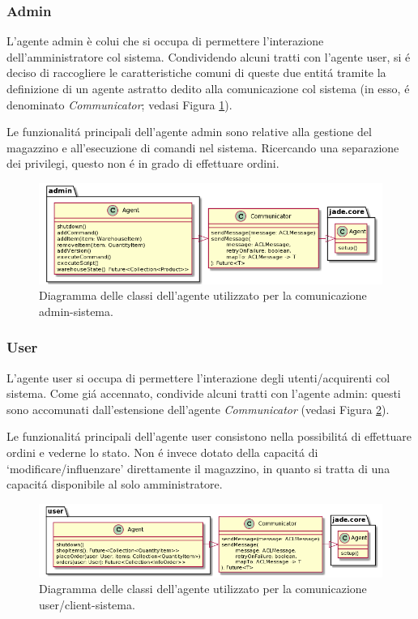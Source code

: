 \subsubsection{Admin}
L'agente admin \`e colui che si occupa di permettere l'interazione dell'amministratore col sistema. Condividendo alcuni tratti con l'agente user, si \'e deciso di raccogliere le caratteristiche comuni di queste due entit\'a tramite la definizione di un agente astratto dedito alla comunicazione col sistema (in esso, \'e denominato \textit{Communicator}; vedasi Figura \ref{fig:class_diagram_admin_agent}).

Le funzionalit\'a principali dell'agente admin sono relative alla gestione del magazzino e all'esecuzione di comandi nel sistema. Ricercando una separazione dei privilegi, questo non \'e in grado di effettuare ordini.
\begin{figure}[!ht]\centering
    \includegraphics[width=\textwidth]{section/design/figure/admin/class_diagram.png}
    \caption{Diagramma delle classi dell'agente utilizzato per la comunicazione admin-sistema.}
    \label{fig:class_diagram_admin_agent}
\end{figure}

\subsubsection{User}
L'agente user si occupa di permettere l'interazione degli utenti/acquirenti col sistema. Come gi\'a accennato, condivide alcuni tratti con l'agente admin: questi sono accomunati dall'estensione dell'agente \textit{Communicator} (vedasi Figura \ref{fig:class_diagram_user_agent}).

Le funzionalit\'a principali dell'agente user consistono nella possibilit\'a di effettuare ordini e vederne lo stato. Non \'e invece dotato della capacit\'a di `modificare/influenzare' direttamente il magazzino, in quanto si tratta di una capacit\'a disponibile al solo amministratore.
\begin{figure}[!ht]\centering
    \includegraphics[width=\textwidth]{section/design/figure/user/class_diagram.png}
    \caption{Diagramma delle classi dell'agente utilizzato per la comunicazione user/client-sistema.}
    \label{fig:class_diagram_user_agent}
\end{figure}

